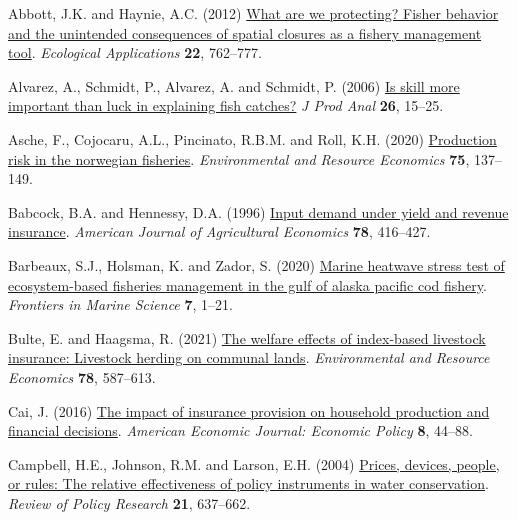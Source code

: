 \documentclass[
  letterpaper,
  DIV=11,
  numbers=noendperiod]{scrartcl}
\newlength{\cslhangindent}
\newlength{\cslentryspacingunit} %
\newenvironment{CSLReferences}[2] %
 {%
  \setlength{\parindent}{0pt}
  \ifodd #1
  \let\oldpar\par
  \def\par{\hangindent=\cslhangindent\oldpar}
  \fi
  \setlength{\parskip}{#2\cslentryspacingunit}
 }%
 {}
\theoremstyle{plain}
\theoremstyle{plain}
\theoremstyle{remark}
\begin{document}
\hypertarget{refs}{}
\begin{CSLReferences}{1}{0}
\leavevmode{}%
Abbott, J.K. and Haynie, A.C. (2012)
\href{https://doi.org/10.1890/11-1319.1}{What are we protecting? Fisher
behavior and the unintended consequences of spatial closures as a
fishery management tool}. \emph{Ecological Applications} \textbf{22},
762--777.

\leavevmode{}%
Alvarez, A., Schmidt, P., Alvarez, A. and Schmidt, P. (2006)
\href{https://doi.org/10.1007/s11123-006-0002-x}{Is skill more important
than luck in explaining fish catches?} \emph{J Prod Anal} \textbf{26},
15--25.

\leavevmode{}%
Asche, F., Cojocaru, A.L., Pincinato, R.B.M. and Roll, K.H. (2020)
\href{https://doi.org/10.1007/s10640-019-00391-2}{Production risk in the
norwegian fisheries}. \emph{Environmental and Resource Economics}
\textbf{75}, 137--149.

\leavevmode{}%
Babcock, B.A. and Hennessy, D.A. (1996)
\href{https://doi.org/10.2307/1243713}{Input demand under yield and
revenue insurance}. \emph{American Journal of Agricultural Economics}
\textbf{78}, 416--427.

\leavevmode{}%
Barbeaux, S.J., Holsman, K. and Zador, S. (2020)
\href{https://doi.org/10.3389/fmars.2020.00703}{Marine heatwave stress
test of ecosystem-based fisheries management in the gulf of alaska
pacific cod fishery}. \emph{Frontiers in Marine Science} \textbf{7},
1--21.

\leavevmode{}%
Bulte, E. and Haagsma, R. (2021)
\href{https://doi.org/10.1007/s10640-021-00545-1}{The welfare effects of
index-based livestock insurance: Livestock herding on communal lands}.
\emph{Environmental and Resource Economics} \textbf{78}, 587--613.

\leavevmode{}%
Cai, J. (2016) \href{https://doi.org/10.1257/pol.20130371}{The impact of
insurance provision on household production and financial decisions}.
\emph{American Economic Journal: Economic Policy} \textbf{8}, 44--88.

\leavevmode{}%
Campbell, H.E., Johnson, R.M. and Larson, E.H. (2004)
\href{https://doi.org/10.1111/j.1541-1338.2004.00099.x}{Prices, devices,
people, or rules: The relative effectiveness of policy instruments in
water conservation}. \emph{Review of Policy Research} \textbf{21},
637--662.


\end{CSLReferences}
\end{document}
